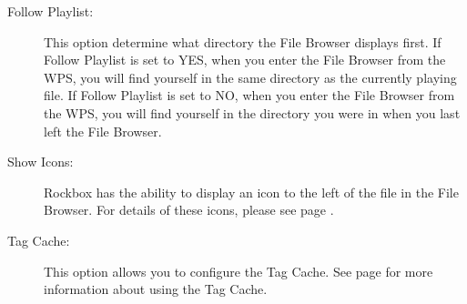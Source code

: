 \begin{description}
  \item[Follow Playlist:]
    This option determine what directory the File Browser displays first.  
    If Follow Playlist is set to YES, when you enter the File Browser from 
    the WPS, you will find yourself in the same directory as the currently 
    playing file.  If Follow Playlist is set to NO, when you enter the File 
    Browser from the WPS, you will find yourself in the directory you were 
    in when you last left the File Browser.
    
  \item[Show Icons:]
    Rockbox has the ability to display an icon to the left of the file 
    in the File Browser.  For details of these icons, please see page 
    \pageref{ref:Supportedfileformats}.
    
  \item[Tag Cache:]
  This option allows you to configure the Tag Cache.
  	See page \pageref{ref:tagcache} for more information about using
    the Tag Cache.
    
  \end{description}
